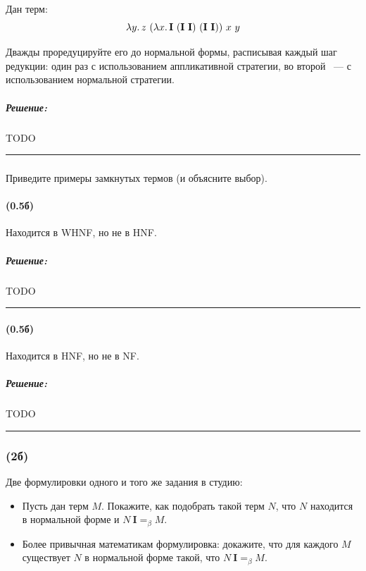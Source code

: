 \documentclass{article}
\newenvironment{proof}{\subparagraph{\hspace{-1em}Решение:\newline}}{\par\noindent\rule{\textwidth}{0.4pt}}
\newcommand{\comb}[1]{\mathbf{#1}}
\newcommand{\eqbeta}{=_\beta}
\begin{document}
    Дан терм:
    \[\lambda y\ldotp z~(\lambda x\ldotp \comb{I}~(\comb{I}~\comb{I})~(\comb{I}~\comb{I}))~x~y\]

    Дважды проредуцируйте его до нормальной формы, расписывая каждый шаг редукции: один раз с использованием аппликативной стратегии, во второй ~--- с
    использованием нормальной стратегии.

    \begin{proof}
        TODO %
    \end{proof}

    \subsubsection{}

    Приведите примеры замкнутых термов (и объясните выбор).

    \paragraph{(0.5б)}

    Находится в WHNF, но не в HNF.

    \begin{proof}
        TODO %
    \end{proof}

    \paragraph{(0.5б)}

    Находится в HNF, но не в NF.

    \begin{proof}
        TODO %
    \end{proof}

    \subsubsection{(2б)}

    Две формулировки одного и того же задания в студию:
    \begin{itemize}
        \item Пусть дан терм $M$.
        Покажите, как подобрать такой терм $N$, что $N$ находится в нормальной форме и $N~\comb{I} =_\beta M$.
        \item Более привычная математикам формулировка: докажите, что для каждого $M$ существует $N$ в нормальной форме такой, что $N~\comb{I} \eqbeta M$.
    \end{itemize}
\end{document}
